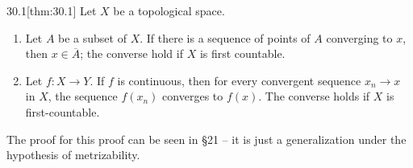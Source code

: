 \begin{thmBox}{30.1}[thm:30.1]
    Let \( X \) be a topological space.

    \begin{enumerate}[label = (\alph*)]
        \item Let \( A \) be a subset of \( X \). If there is a sequence of 
            points of \( A \) converging to \( x \), then
            \( x \in \overline{ A } \); the converse hold if \( X \) is 
            first countable.
        \item Let \( f: X \rightarrow Y \). If \( f \) is continuous, then for
            every convergent sequence \( x_{ n } \rightarrow x \) in \( X \),
            the sequence \( f ( x_{ n } ) \) converges to \( f ( x ) \).
            The converse holds if \( X \) is first-countable.
    \end{enumerate}

    \baseRule

    \begin{proofBox}
        The proof for this proof can be seen in \S 21 -- it is just a generalization
        under the hypothesis of metrizability. 
    \end{proofBox}
\end{thmBox}

